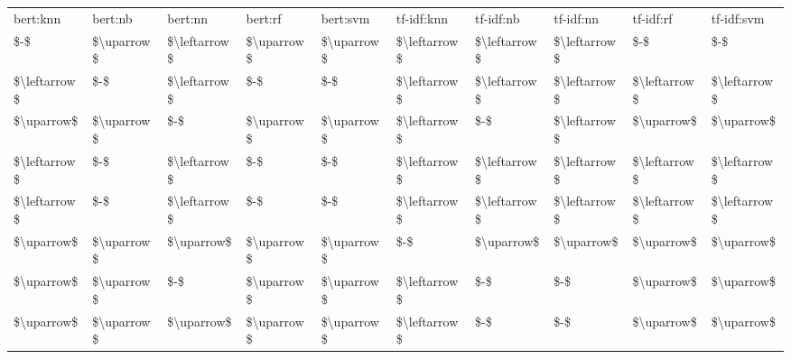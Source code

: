 \begin{tabular}{llllllllll}
\toprule
    bert:knn &    bert:nb &      bert:nn &    bert:rf &   bert:svm &   tf-idf:knn &    tf-idf:nb &    tf-idf:nn &    tf-idf:rf &   tf-idf:svm \\
         \$-\$ & \$\textbackslash uparrow\$ & \$\textbackslash leftarrow\$ & \$\textbackslash uparrow\$ & \$\textbackslash uparrow\$ & \$\textbackslash leftarrow\$ & \$\textbackslash leftarrow\$ & \$\textbackslash leftarrow\$ &          \$-\$ &          \$-\$ \\
\midrule
\$\textbackslash leftarrow\$ &        \$-\$ & \$\textbackslash leftarrow\$ &        \$-\$ &        \$-\$ & \$\textbackslash leftarrow\$ & \$\textbackslash leftarrow\$ & \$\textbackslash leftarrow\$ & \$\textbackslash leftarrow\$ & \$\textbackslash leftarrow\$ \\
  \$\textbackslash uparrow\$ & \$\textbackslash uparrow\$ &          \$-\$ & \$\textbackslash uparrow\$ & \$\textbackslash uparrow\$ & \$\textbackslash leftarrow\$ &          \$-\$ & \$\textbackslash leftarrow\$ &   \$\textbackslash uparrow\$ &   \$\textbackslash uparrow\$ \\
\$\textbackslash leftarrow\$ &        \$-\$ & \$\textbackslash leftarrow\$ &        \$-\$ &        \$-\$ & \$\textbackslash leftarrow\$ & \$\textbackslash leftarrow\$ & \$\textbackslash leftarrow\$ & \$\textbackslash leftarrow\$ & \$\textbackslash leftarrow\$ \\
\$\textbackslash leftarrow\$ &        \$-\$ & \$\textbackslash leftarrow\$ &        \$-\$ &        \$-\$ & \$\textbackslash leftarrow\$ & \$\textbackslash leftarrow\$ & \$\textbackslash leftarrow\$ & \$\textbackslash leftarrow\$ & \$\textbackslash leftarrow\$ \\
  \$\textbackslash uparrow\$ & \$\textbackslash uparrow\$ &   \$\textbackslash uparrow\$ & \$\textbackslash uparrow\$ & \$\textbackslash uparrow\$ &          \$-\$ &   \$\textbackslash uparrow\$ &   \$\textbackslash uparrow\$ &   \$\textbackslash uparrow\$ &   \$\textbackslash uparrow\$ \\
  \$\textbackslash uparrow\$ & \$\textbackslash uparrow\$ &          \$-\$ & \$\textbackslash uparrow\$ & \$\textbackslash uparrow\$ & \$\textbackslash leftarrow\$ &          \$-\$ &          \$-\$ &   \$\textbackslash uparrow\$ &   \$\textbackslash uparrow\$ \\
  \$\textbackslash uparrow\$ & \$\textbackslash uparrow\$ &   \$\textbackslash uparrow\$ & \$\textbackslash uparrow\$ & \$\textbackslash uparrow\$ & \$\textbackslash leftarrow\$ &          \$-\$ &          \$-\$ &   \$\textbackslash uparrow\$ &   \$\textbackslash uparrow\$ \\

\end{tabular}
